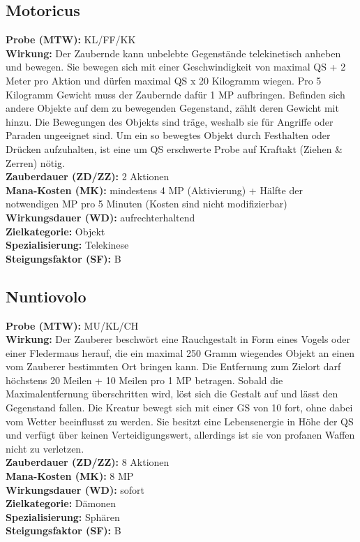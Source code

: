 \subsection{Motoricus}
\label{chap:motoricus}
\textbf{Probe (MTW):} KL/FF/KK \\
\textbf{Wirkung:} Der Zaubernde kann unbelebte Gegenstände telekinetisch anheben und bewegen. Sie bewegen sich mit einer Geschwindigkeit von maximal QS + 2 Meter pro Aktion und dürfen maximal QS x 20 Kilogramm wiegen. Pro 5 Kilogramm Gewicht muss der Zaubernde dafür 1 MP aufbringen. Befinden sich andere Objekte auf dem zu bewegenden Gegenstand, zählt deren Gewicht mit hinzu. Die Bewegungen des Objekts sind träge, weshalb sie für Angriffe oder Paraden ungeeignet sind. Um ein so bewegtes Objekt durch Festhalten oder Drücken aufzuhalten, ist eine um QS erschwerte Probe auf Kraftakt (Ziehen \& Zerren) nötig.\\
\textbf{Zauberdauer (ZD/ZZ):} 2 Aktionen \\
\textbf{Mana-Kosten (MK):} mindestens 4 MP (Aktivierung) + Hälfte der notwendigen MP pro 5 Minuten (Kosten sind nicht modifizierbar) \\
\textbf{Wirkungsdauer (WD):} aufrechterhaltend \\
\textbf{Zielkategorie:} Objekt \\
\textbf{Spezialisierung:} Telekinese \\
\textbf{Steigungsfaktor (SF):} B


\subsection{Nuntiovolo}
\label{chap:nuntiovolo}
\textbf{Probe (MTW):} MU/KL/CH \\
\textbf{Wirkung:} Der Zauberer beschwört eine Rauchgestalt in Form eines Vogels oder einer Fledermaus herauf, die ein maximal 250 Gramm wiegendes Objekt an einen vom Zauberer bestimmten Ort bringen kann. Die Entfernung zum Zielort darf höchstens 20 Meilen + 10 Meilen pro 1 MP betragen. Sobald die Maximalentfernung überschritten wird, löst sich die Gestalt auf und lässt den Gegenstand fallen. Die Kreatur bewegt sich mit einer GS von 10 fort, ohne dabei vom Wetter beeinflusst zu werden. Sie besitzt eine Lebensenergie in Höhe der QS und verfügt über keinen Verteidigungswert, allerdings ist sie von profanen Waffen nicht zu verletzen.\\
\textbf{Zauberdauer (ZD/ZZ):} 8 Aktionen \\
\textbf{Mana-Kosten (MK):} 8 MP \\
\textbf{Wirkungsdauer (WD):} sofort \\
\textbf{Zielkategorie:} Dämonen \\
\textbf{Spezialisierung:} Sphären \\
\textbf{Steigungsfaktor (SF):} B



